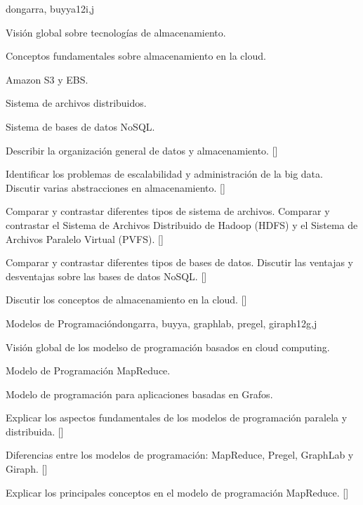 \begin{syllabus}
\begin{unit}{\PDCloudComputing}{}{dongarra, buyya}{12}{i,j}
\begin{topics}
    \item \PDCloudComputingTopicCloudBased
    \item Visión global sobre tecnologías de almacenamiento.
    \item Conceptos fundamentales sobre almacenamiento en la cloud.
    \item Amazon S3 y EBS.
    \item Sistema de archivos distribuidos.
    \item Sistema de bases de datos NoSQL.
\end{topics}
\begin{learningoutcomes}
    \item Describir la organización general de datos y almacenamiento. [\Familiarity]
    \item Identificar los problemas de escalabilidad y administración de la big data. Discutir varias abstracciones en almacenamiento. [\Familiarity]
    \item Comparar y contrastar diferentes tipos de sistema de archivos. Comparar y contrastar el Sistema de Archivos Distribuido de Hadoop (HDFS) y el Sistema de Archivos Paralelo Virtual (PVFS).  [\Usage]
    \item Comparar y contrastar diferentes tipos de bases de datos. Discutir las ventajas y desventajas sobre las bases de datos NoSQL. [\Usage]
    \item Discutir los conceptos de almacenamiento en la cloud. [\Familiarity]
\end{learningoutcomes}
\end{unit}

\begin{unit}{Modelos de Programación}{}{dongarra, buyya, graphlab, pregel, giraph}{12}{g,j}
\begin{topics}
    \item Visión global de los modelso de programación basados en cloud computing.
    \item Modelo de Programación MapReduce.
    \item Modelo de programación para aplicaciones basadas en Grafos.
\end{topics}
\begin{learningoutcomes}
    \item Explicar los aspectos fundamentales de los modelos de programación paralela y distribuida. [\Familiarity]
    \item Diferencias entre los modelos de programación: MapReduce, Pregel, GraphLab y Giraph. [\Usage]
    \item Explicar los principales conceptos en el modelo de programación MapReduce.  [\Usage]
\end{learningoutcomes}
\end{unit}

\begin{coursebibliography}
\end{coursebibliography}

\end{syllabus}
